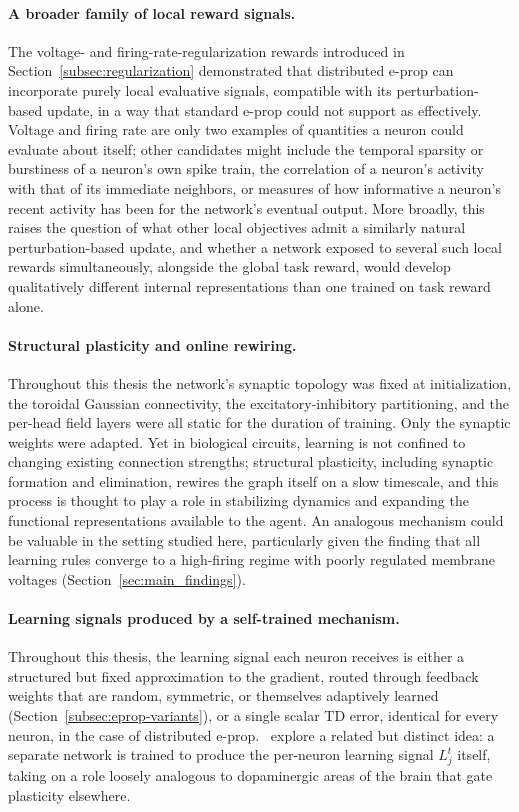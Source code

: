 \paragraph{A broader family of local reward signals.} The voltage- and
firing-rate-regularization rewards introduced in
Section~\ref{subsec:regularization} demonstrated that distributed e-prop can
incorporate purely local evaluative signals, compatible with its
perturbation-based update, in a way that standard e-prop could not
support as effectively. Voltage and firing rate are only two examples of
quantities a neuron could evaluate about itself; other candidates might
include the temporal sparsity or burstiness of a neuron's own spike
train, the correlation of a neuron's activity with that of its immediate
neighbors, or measures of how informative a neuron's recent activity has
been for the network's eventual output. More broadly, this raises the
question of what other local objectives admit a similarly natural
perturbation-based update, and whether a network exposed to several such
local rewards simultaneously, alongside the global task reward, would
develop qualitatively different internal representations than one trained
on task reward alone.

\paragraph{Structural plasticity and online rewiring.} Throughout this thesis the
network's synaptic topology was fixed at initialization, the toroidal Gaussian
connectivity, the excitatory-inhibitory partitioning, and the per-head field
layers were all static for the duration of training. Only the synaptic weights
were adapted. Yet in biological circuits, learning is not confined to changing
existing connection strengths; structural plasticity, including synaptic
formation and elimination, rewires the graph itself on a slow timescale, and
this process is thought to play a role in stabilizing dynamics and expanding
the functional representations available to the agent. An analogous mechanism
could be valuable in the setting studied here, particularly given the finding
that all learning rules converge to a high-firing regime with poorly
regulated membrane voltages (Section~\ref{sec:main_findings}).

\paragraph{Learning signals produced by a self-trained mechanism.} Throughout this thesis, the learning
signal each neuron receives is either a structured but fixed
approximation to the gradient, routed through feedback weights that are
random, symmetric, or themselves adaptively learned
(Section~\ref{subsec:eprop-variants}), or a single scalar TD error, identical
for every neuron, in the case of distributed e-prop.\
\citep{OneShotEprop} explore a related but distinct idea: a separate
network is trained to produce the per-neuron learning signal $L^t_j$
itself, taking on a role loosely analogous to dopaminergic areas of the
brain that gate plasticity elsewhere.

